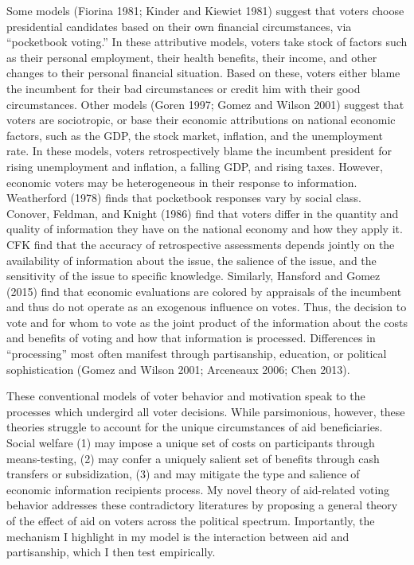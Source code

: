 \documentclass[12pt]{paper}
\begin{document}
Some models (Fiorina 1981; Kinder and Kiewiet 1981) suggest that voters choose presidential candidates based on their own financial circumstances, via “pocketbook voting.” In these attributive models, voters take stock of factors such as their personal employment, their health benefits, their income, and other changes to their personal financial situation. Based on these, voters either blame the incumbent for their bad circumstances or credit him with their good circumstances. Other models (Goren 1997; Gomez and Wilson 2001) suggest that voters are sociotropic, or base their economic attributions on national economic factors, such as the GDP, the stock market, inflation, and the unemployment rate. In these models, voters retrospectively blame the incumbent president for rising unemployment and inflation, a falling GDP, and rising taxes.  However, economic voters may be heterogeneous in their response to information. Weatherford (1978) finds that pocketbook responses vary by social class. Conover, Feldman, and Knight  (1986) find that voters differ in the quantity and quality of information they have on the national economy and how they apply it. CFK find that the accuracy of retrospective assessments depends jointly on the availability of information about the issue, the salience of the issue, and the sensitivity of the issue to specific knowledge. Similarly, Hansford and Gomez (2015) find that economic evaluations are colored by appraisals of the incumbent and thus do not operate as an exogenous influence on votes. Thus, the decision to vote and for whom to vote as the joint product of the information about the costs and benefits of voting and how that information is processed. Differences in “processing” most often manifest through partisanship, education, or political sophistication (Gomez and Wilson 2001; Arceneaux 2006; Chen 2013). 

These conventional models of voter behavior and motivation speak to the processes which undergird all voter decisions. While parsimonious, however, these theories struggle to account for the unique circumstances of aid beneficiaries. Social welfare (1) may impose a unique set of costs on participants through means-testing, (2) may confer a uniquely salient set of benefits through cash transfers or subsidization, (3) and may mitigate the type and salience of economic information recipients process. My novel theory of aid-related voting behavior addresses these contradictory literatures by proposing a general theory of the effect of aid on voters across the political spectrum. Importantly, the mechanism I highlight in my model is the interaction between aid and partisanship, which I then test empirically.
\end{document}
